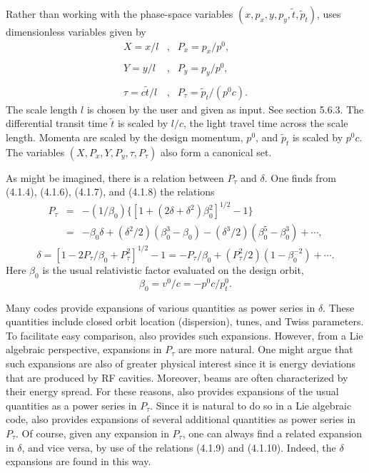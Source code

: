 	 Rather than working with the phase-space variables
$(x,p_x,y,p_y,\tilde{t},\tilde{p}_t)$,
\Mary uses dimensionless variables given by 
\begin{equation}
\begin{array}{rcl}
       X = x/l & , & P_x = p_x/p^0,  \\
                       &   &              \\
       Y = y/l & , & P_y = p_y/p^0   ,    \\
                       &   &              \\
       \tau = c\tilde{t}/l & , & P_{\tau} = \tilde{p}_t/(p^0c).
\end{array}
\end{equation}
The scale length $l$ is chosen by the user and given as input.  See
section 5.6.3.  The differential transit time $\tilde{t}$ is
scaled by $l/c$, the light travel time across the scale length.  Momenta are
scaled by the design momentum, $p^0$, and $\tilde{p}_t$ is scaled by
$p^0c$.  The variables $(X, P_x, Y, P_y, \tau, P_{\tau})$ also form a
canonical set.  

	As might be imagined, there is a relation between $P_{\tau}$ and
$\delta$.  One finds from (4.1.4), (4.1.6), (4.1.7), and (4.1.8)
the relations
\begin{eqnarray}
P_{\tau} &=& -(1/\beta_0) \{ [1 + (2\delta + \delta^2)\beta^2_0]^{1/2} -
1\} \nonumber \\
&=& -\beta_0 \delta + (\delta^2/2)(\beta^3_0 - \beta_0) -
(\delta^3/2)(\beta^5_0 - \beta^3_0) + \cdots,
\end{eqnarray}
\begin{equation}
\delta = [1 - 2P_{\tau}/\beta_0 + P_{\tau}^2]^{1/2} - 1 = -P_{\tau}/\beta_0 + (P^2_{\tau}/2) (1 - \beta^{-2}_0) + \cdots.
\end{equation}
Here $\beta_0$ is the usual relativistic factor evaluated on the design
orbit,
\begin{equation}
\beta_0 = v^0/c = -p^0c/p^0_t.
\end{equation}

Many codes provide expansions of various
quantities as power series in $\delta$.  These quantities include closed
orbit location (dispersion), tunes, and Twiss parameters.  To facilitate
easy comparison, \Mary also
provides such expansions.  However, from a Lie algebraic perspective,
expansions in $P_{\tau}$ are more natural.  One might argue that such
expansions are also of greater physical interest since it is energy
deviations that are produced by RF cavities.  Moreover, beams are often
characterized by their energy spread.  For these reasons, \Mary also
provides expansions of the usual quantities as a power series in
$P_{\tau}$.  Since it is natural to do so in a Lie algebraic code, \Mary
also provides expansions of several additional quantities as power series
in $P_{\tau}$.  Of course, given any expansion in $P_{\tau}$, one can
always find a related expansion in $\delta$, and vice versa, by use of
the relations (4.1.9) and (4.1.10).  Indeed, the \Mary $\delta$
expansions are found in this way.

